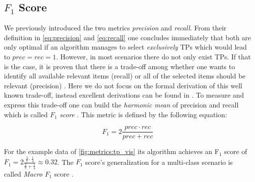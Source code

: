 \subsection{$F_1$ Score}
\label{chp:fundamentals:sec:metrics:subsec:f1_score}

We previously introduced the two metrics \textit{precision} and \textit{recall}.
From their definition in \cref{eq:precision} and \cref{eq:recall} one concludes immediately that both are only optimal if an algorithm manages to select \textit{exclusively} \acp{TP} which would lead to $prec = rec = 1$.
However, in most scenarios there do not only exist \acp{TP}.
If that is the case, it is proven that there is a trade-off among whether one wants to identify all available relevant items (recall) or all of the selected items should be relevant (precision) \parencite{Gordon:1989}.
Here we do not focus on the formal derivation of this well known trade-off, instead excellent derivations can be found in \textcites{Gordon:1989}{Zhu:2004}.
To measure and express this trade-off one can build the \textit{harmonic mean} of precision and recall which is called \textit{$F_1$ score} \parencite{Powers:2011}.
This metric is defined by the following equation:

\begin{equation}\label{eq:f1_score}
    F_1 = 2 \frac{prec \cdot rec}{prec+rec}
\end{equation}

For the example data of \cref{fig:metrics:tp_vis} its algorithm achieves an F$_1$ score of $F_1 = 2 \frac{\frac{3}{7} \cdot \frac{1}{4}}{\frac{3}{7}+\frac{1}{4}} \approx 0.32$.
The $F_1$ score's generalization for a multi-class scenario is called \textit{Macro $F_1$} score \parencite{Opitz:2019}.
